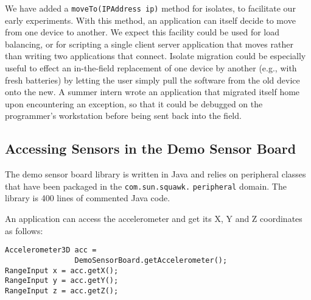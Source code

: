 \documentclass{sigplanconf}
\begin{document}


We have added a \texttt{moveTo(IPAddress ip)} method for isolates, to facilitate 
our early experiments.  With this method, an application can itself decide 
to move from one device to another.  We expect this facility could be used 
for load balancing, or for scripting a single client server application 
that moves rather than writing two applications that connect. 
Isolate migration could be especially useful to effect an in-the-field 
replacement of one device by another (e.g., with fresh batteries) by 
letting the user simply pull the software from the old device onto the new. 
A summer intern wrote an application that migrated itself home upon 
encountering an exception, so that it could be debugged on the programmer's 
workstation before being sent back into the field. 


\subsection{Accessing Sensors in the Demo Sensor Board}

The demo sensor board library is written in Java and 
relies on peripheral classes that have been packaged in the
\texttt{com.sun.squawk.} \texttt{peripheral} domain.
The library is 400 lines of commented Java code.

An application can access the accelerometer and get its X, Y and Z 
coordinates as follows: 

\begin{verbatim}
Accelerometer3D acc =
                DemoSensorBoard.getAccelerometer();
RangeInput x = acc.getX();
RangeInput y = acc.getY();
RangeInput z = acc.getZ();
\end{verbatim}
\end{document}
